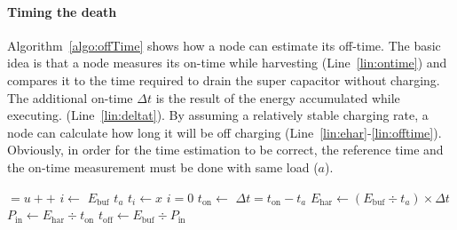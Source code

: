 \paragraph{Timing the death} 
Algorithm~\ref{algo:offTime} shows how a node can estimate its off-time. The basic idea is that a node measures its on-time while harvesting (Line~\ref{lin:ontime}) and compares it to the time required to drain the super capacitor without charging. The additional on-time $\Delta{t}$ is the result of the energy accumulated while executing. (Line~\ref{lin:deltat}). By assuming a relatively stable charging rate, a node can calculate how long it will be off charging (Line~\ref{lin:ehar}-\ref{lin:offtime}). Obviously, in order for the time estimation to be correct, the reference time and the on-time measurement must be done with same load ($a$). %
\begin{algorithm}[t]
    \label{algo:offTime}
    \small
    \begin{algorithmic}[1]
		\State {} $= u{+}{+}$ 
		\State $i \leftarrow $  
		\State $E_\text{buf}$ 
		\State $t_a$ 
		\State$ t_{i} \leftarrow x $ 
		    \State $i=0$
			\State {} 
			\State \label{lin:ontime} $t_\text{on} \leftarrow$  
		\EndIf
			\State \label{lin:deltat}$\Delta{t} = t_\text{on}-t_a$  
			\State \label{lin:ehar}$E_\text{har} \leftarrow (E_\text{buf}\div t_a)\times\Delta{t}$ 
			\State $P_\text{in} \leftarrow E_\text{har}\div{t_\text{on}}$ 
			\State \label{lin:offtime}$t_\text{off} \leftarrow E_\text{buf}\div P_\text{in}$
		\EndIf
	\end{algorithmic}
\end{algorithm}

